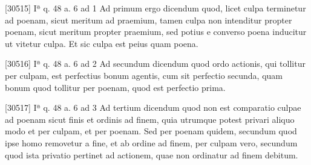 \documentclass[paper=a4paper,fontsize=10pt,jafontsize=9pt,titlepage]{jlreq}
\begin{document}
[30515] Iª q. 48 a. 6 ad 1 Ad primum ergo dicendum quod, licet culpa terminetur ad poenam, sicut meritum ad praemium, tamen culpa non intenditur propter poenam, sicut meritum propter praemium, sed potius e converso poena inducitur ut vitetur culpa. Et sic culpa est peius quam poena.

[30516] Iª q. 48 a. 6 ad 2 Ad secundum dicendum quod ordo actionis, qui tollitur per culpam, est perfectius bonum agentis, cum sit perfectio secunda, quam bonum quod tollitur per poenam, quod est perfectio prima.

[30517] Iª q. 48 a. 6 ad 3 Ad tertium dicendum quod non est comparatio culpae ad poenam sicut finis et ordinis ad finem, quia utrumque potest privari aliquo modo et per culpam, et per poenam. Sed per poenam quidem, secundum quod ipse homo removetur a fine, et ab ordine ad finem, per culpam vero, secundum quod ista privatio pertinet ad actionem, quae non ordinatur ad finem debitum.
\end{document}
